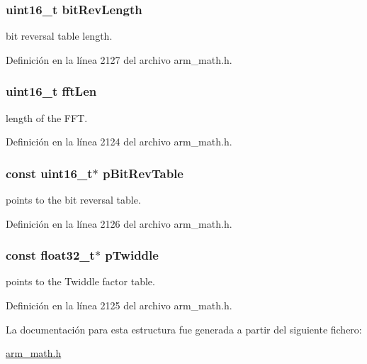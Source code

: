 \subsubsection[{\texorpdfstring{bit\+Rev\+Length}{bitRevLength}}]{\setlength{\rightskip}{0pt plus 5cm}uint16\+\_\+t bit\+Rev\+Length}\hypertarget{structarm__cfft__instance__f32_a65e1b3e327b8fab9404287ed8f347cc8}{}\label{structarm__cfft__instance__f32_a65e1b3e327b8fab9404287ed8f347cc8}
bit reversal table length. 

Definición en la línea 2127 del archivo arm\+\_\+math.\+h.

\subsubsection[{\texorpdfstring{fft\+Len}{fftLen}}]{\setlength{\rightskip}{0pt plus 5cm}uint16\+\_\+t fft\+Len}\hypertarget{structarm__cfft__instance__f32_ab8db3bbe7c61e6bb8ca2a55e3446e11a}{}\label{structarm__cfft__instance__f32_ab8db3bbe7c61e6bb8ca2a55e3446e11a}
length of the F\+FT. 

Definición en la línea 2124 del archivo arm\+\_\+math.\+h.

\subsubsection[{\texorpdfstring{p\+Bit\+Rev\+Table}{pBitRevTable}}]{\setlength{\rightskip}{0pt plus 5cm}const uint16\+\_\+t$\ast$ p\+Bit\+Rev\+Table}\hypertarget{structarm__cfft__instance__f32_a3b229432d381b0a511a9cdbe3aa74e78}{}\label{structarm__cfft__instance__f32_a3b229432d381b0a511a9cdbe3aa74e78}
points to the bit reversal table. 

Definición en la línea 2126 del archivo arm\+\_\+math.\+h.

\subsubsection[{\texorpdfstring{p\+Twiddle}{pTwiddle}}]{\setlength{\rightskip}{0pt plus 5cm}const {\bf float32\+\_\+t}$\ast$ p\+Twiddle}\hypertarget{structarm__cfft__instance__f32_a8292d9775f5c5472f59915649fe3b378}{}\label{structarm__cfft__instance__f32_a8292d9775f5c5472f59915649fe3b378}
points to the Twiddle factor table. 

Definición en la línea 2125 del archivo arm\+\_\+math.\+h.



La documentación para esta estructura fue generada a partir del siguiente fichero\+:\begin{DoxyCompactItemize}
\item 
\hyperlink{arm__math_8h}{arm\+\_\+math.\+h}\end{DoxyCompactItemize}
